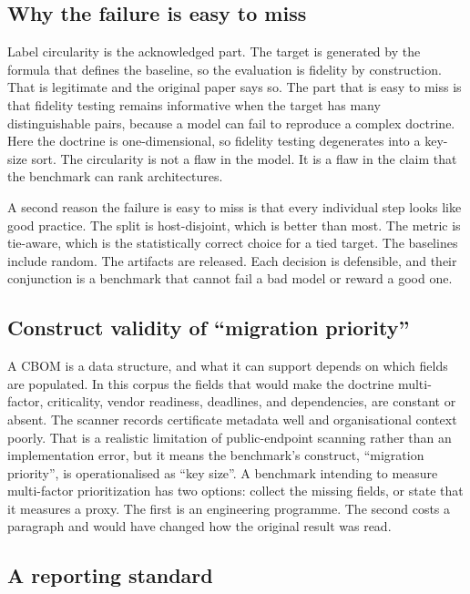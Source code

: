 \documentclass[journal,10pt]{IEEEtran}
\begin{document}
\subsection{Why the failure is easy to miss}

Label circularity is the acknowledged part. The target is generated by the formula that defines the
baseline, so the evaluation is fidelity by construction. That is legitimate and the original paper
says so. The part that is easy to miss is that fidelity testing remains informative when the target
has many distinguishable pairs, because a model can fail to reproduce a complex doctrine. Here the
doctrine is one-dimensional, so fidelity testing degenerates into a key-size sort. The circularity
is not a flaw in the model. It is a flaw in the claim that the benchmark can rank architectures.

A second reason the failure is easy to miss is that every individual step looks like good practice.
The split is host-disjoint, which is better than most. The metric is tie-aware, which is the
statistically correct choice for a tied target. The baselines include random. The artifacts are
released. Each decision is defensible, and their conjunction is a benchmark that cannot fail a bad
model or reward a good one.

\subsection{Construct validity of ``migration priority''}

A CBOM is a data structure, and what it can support depends on which fields are populated. In this
corpus the fields that would make the doctrine multi-factor, criticality, vendor readiness,
deadlines, and dependencies, are constant or absent. The scanner records certificate metadata well
and organisational context poorly. That is a realistic limitation of public-endpoint scanning
rather than an implementation error, but it means the benchmark's construct, ``migration
priority'', is operationalised as ``key size''. A benchmark intending to measure multi-factor
prioritization has two options: collect the missing fields, or state that it measures a proxy. The
first is an engineering programme. The second costs a paragraph and would have changed how the
original result was read.

\subsection{A reporting standard}
\end{document}
